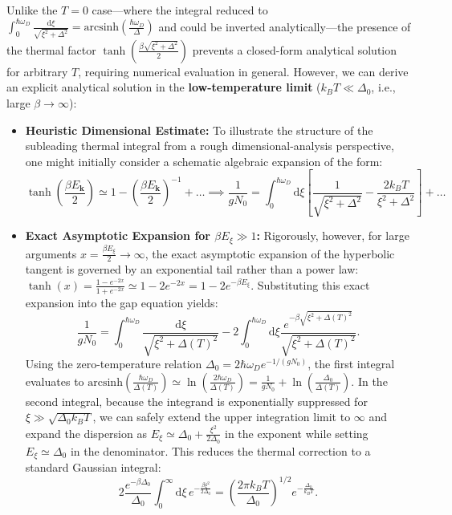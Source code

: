 Unlike the \( T = 0 \) case—where the integral reduced to \( \int_0^{\hbar\omega_D} \frac{\mathrm{d}\xi}{\sqrt{\xi^2 + \Delta^2}} = \text{arcsinh}\left(\frac{\hbar\omega_D}{\Delta}\right) \) and could be inverted analytically—the presence of the thermal factor \( \tanh\left(\frac{\beta\sqrt{\xi^2 + \Delta^2}}{2}\right) \) prevents a closed-form analytical solution for arbitrary \( T \), requiring numerical evaluation in general. However, we can derive an explicit analytical solution in the \textbf{low-temperature limit} (\( k_B T \ll \Delta_0 \), i.e., large \( \beta \to \infty \)):
\begin{itemize}
    \item \textbf{Heuristic Dimensional Estimate:} To illustrate the structure of the subleading thermal integral from a rough dimensional-analysis perspective, one might initially consider a schematic algebraic expansion of the form:
          \[
              \tanh\left(\frac{\beta E_{\mathbf{k}}}{2}\right) \simeq 1 - \left(\frac{\beta E_{\mathbf{k}}}{2}\right)^{-1} + \dots \implies \frac{1}{gN_0} = \int_0^{\hbar\omega_D} \mathrm{d}\xi \left[ \frac{1}{\sqrt{\xi^2 + \Delta^2}} - \frac{2k_B T}{\xi^2 + \Delta^2} \right] + \dots
          \]
    \item \textbf{Exact Asymptotic Expansion for \( \beta E_\xi \gg 1 \):} Rigorously, however, for large arguments \( x = \frac{\beta E_\xi}{2} \to \infty \), the exact asymptotic expansion of the hyperbolic tangent is governed by an exponential tail rather than a power law: \( \tanh(x) = \frac{1 - e^{-2x}}{1 + e^{-2x}} \simeq 1 - 2e^{-2x} = 1 - 2e^{-\beta E_\xi} \). Substituting this exact expansion into the gap equation yields:
          \[
              \frac{1}{gN_0} = \int_0^{\hbar\omega_D} \frac{\mathrm{d}\xi}{\sqrt{\xi^2 + \Delta(T)^2}} - 2 \int_0^{\hbar\omega_D} \mathrm{d}\xi \frac{e^{-\beta\sqrt{\xi^2 + \Delta(T)^2}}}{\sqrt{\xi^2 + \Delta(T)^2}}.
          \]
          Using the zero-temperature relation \( \Delta_0 = 2\hbar\omega_D e^{-1/(gN_0)} \), the first integral evaluates to \( \text{arcsinh}\left(\frac{\hbar\omega_D}{\Delta(T)}\right) \simeq \ln\left(\frac{2\hbar\omega_D}{\Delta(T)}\right) = \frac{1}{gN_0} + \ln\left(\frac{\Delta_0}{\Delta(T)}\right) \). In the second integral, because the integrand is exponentially suppressed for \( \xi \gg \sqrt{\Delta_0 k_B T} \), we can safely extend the upper integration limit to \( \infty \) and expand the dispersion as \( E_\xi \simeq \Delta_0 + \frac{\xi^2}{2\Delta_0} \) in the exponent while setting \( E_\xi \simeq \Delta_0 \) in the denominator. This reduces the thermal correction to a standard Gaussian integral:
          \[
              2 \frac{e^{-\beta\Delta_0}}{\Delta_0} \int_0^\infty \mathrm{d}\xi \, e^{-\frac{\beta\xi^2}{2\Delta_0}} = \left( \frac{2\pi k_B T}{\Delta_0} \right)^{1/2} e^{-\frac{\Delta_0}{k_B T}}.
          \]
\end{itemize}
